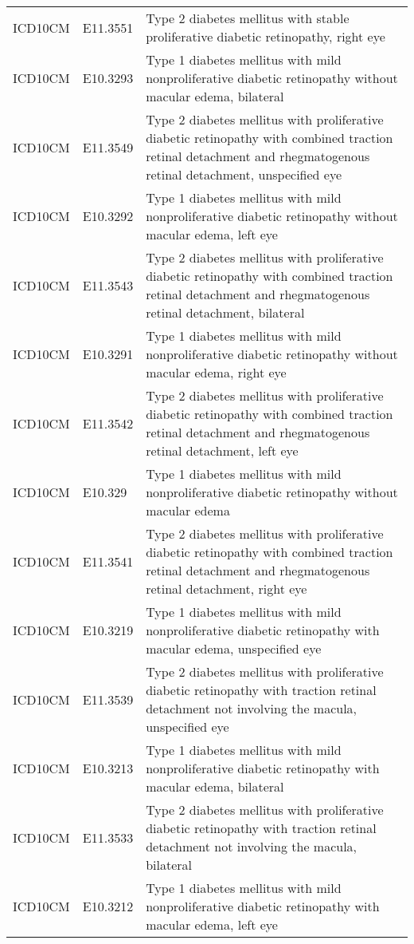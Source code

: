 \begin{table}[ht]
\begin{tabular}{lll}
  ICD10CM & E11.3551 & Type 2 diabetes mellitus with stable proliferative diabetic retinopathy, right eye \\ 
  ICD10CM & E10.3293 & Type 1 diabetes mellitus with mild nonproliferative diabetic retinopathy without macular edema, bilateral \\ 
  ICD10CM & E11.3549 & Type 2 diabetes mellitus with proliferative diabetic retinopathy with combined traction retinal detachment and rhegmatogenous retinal detachment, unspecified eye \\ 
  ICD10CM & E10.3292 & Type 1 diabetes mellitus with mild nonproliferative diabetic retinopathy without macular edema, left eye \\ 
  ICD10CM & E11.3543 & Type 2 diabetes mellitus with proliferative diabetic retinopathy with combined traction retinal detachment and rhegmatogenous retinal detachment, bilateral \\ 
  ICD10CM & E10.3291 & Type 1 diabetes mellitus with mild nonproliferative diabetic retinopathy without macular edema, right eye \\ 
  ICD10CM & E11.3542 & Type 2 diabetes mellitus with proliferative diabetic retinopathy with combined traction retinal detachment and rhegmatogenous retinal detachment, left eye \\ 
  ICD10CM & E10.329 & Type 1 diabetes mellitus with mild nonproliferative diabetic retinopathy without macular edema \\ 
  ICD10CM & E11.3541 & Type 2 diabetes mellitus with proliferative diabetic retinopathy with combined traction retinal detachment and rhegmatogenous retinal detachment, right eye \\ 
  ICD10CM & E10.3219 & Type 1 diabetes mellitus with mild nonproliferative diabetic retinopathy with macular edema, unspecified eye \\ 
  ICD10CM & E11.3539 & Type 2 diabetes mellitus with proliferative diabetic retinopathy with traction retinal detachment not involving the macula, unspecified eye \\ 
  ICD10CM & E10.3213 & Type 1 diabetes mellitus with mild nonproliferative diabetic retinopathy with macular edema, bilateral \\ 
  ICD10CM & E11.3533 & Type 2 diabetes mellitus with proliferative diabetic retinopathy with traction retinal detachment not involving the macula, bilateral \\ 
  ICD10CM & E10.3212 & Type 1 diabetes mellitus with mild nonproliferative diabetic retinopathy with macular edema, left eye \\ 

\end{tabular}
\end{table}
